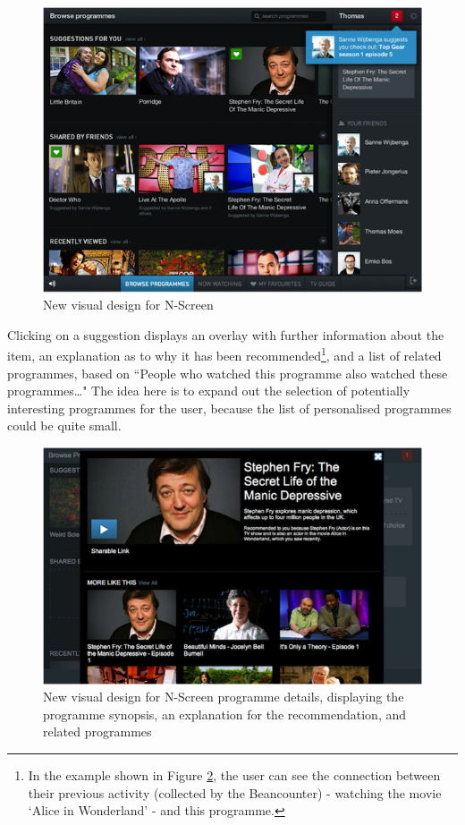 \documentclass{notube}
\begin{document}
 \begin{figure}[htbp]
\begin{center}
\includegraphics[width=6in]{images/ns_new.png}
\caption{New visual design for N-Screen} \label{fig:nsnew}
\end{center}
\end{figure}

Clicking on a suggestion displays an overlay with further information about the item, an explanation as to why it has been recommended\footnote{In the example shown in Figure \ref{fig:fry}, the user can see the connection between their previous activity (collected by the Beancounter) - watching the movie `Alice in Wonderland' - and this programme.}, and a list of related programmes, based on ``People who watched this programme also watched these programmes…" The idea here is to expand out the selection of potentially interesting programmes for the user, because the list of personalised programmes could be quite small.

\begin{figure}[htbp]
\begin{center}
\includegraphics[width=6in]{images/fry.png}
\caption{New visual design for N-Screen programme details, displaying the programme synopsis, an explanation for the recommendation, and related programmes} \label{fig:fry}
\end{center}
\end{figure}
\end{document}
